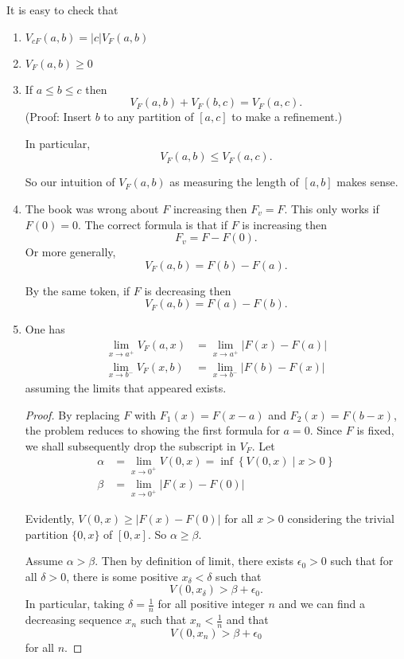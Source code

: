 \documentclass{article}
\newcommand{\Abs}[1]{\left| #1 \right|}
\begin{document}
It is easy to check that
\begin{enumerate}
\item $V_{c F}(a, b) = \Abs{c} V_F(a, b)$

\item $V_F(a, b) \geq 0$

\item If $a \leq b \leq c$ then
$$V_F(a, b) + V_F(b, c) = V_F(a, c).$$
(Proof: Insert $b$ to any partition of $[a, c]$ to make a refinement.)

In particular,
$$V_F(a, b) \leq V_F(a, c).$$

So our intuition of $V_F(a, b)$ as measuring the length of $[a, b]$ makes sense.

\item The book was wrong about $F$ increasing then $F_v = F$. This only works if $F(0) = 0$. The correct formula is that if $F$ is increasing then
$$F_v = F - F(0).$$
Or more generally,
$$V_F(a, b) = F(b) - F(a).$$

By the same token, if $F$ is decreasing then
$$V_F(a, b) = F(a) - F(b).$$

\item One has
\begin{align*}
\lim_{x \rightarrow a^+} V_F(a, x) &= \lim_{x \rightarrow a^+} \Abs{ F(x) - F(a) }\\
\lim_{x \rightarrow b^-} V_F(x, b) &= \lim_{x \rightarrow b^-} \Abs{ F(b) - F(x) }
\end{align*}
assuming the limits that appeared exists.

\begin{proof}
By replacing $F$ with $F_1(x) = F(x - a)$ and $F_2(x) = F(b - x)$, the problem reduces to showing the first formula for $a = 0$. Since $F$ is fixed, we shall subsequently drop the subscript in $V_F$. Let
\begin{align*}
\alpha &= \lim_{x \rightarrow 0^+} V(0, x) = \inf \left\{V(0, x) \;|\; x > 0 \right\}\\
\beta &= \lim_{x \rightarrow 0^+} \Abs{ F(x) - F(0) }
\end{align*}

Evidently, $V(0, x) \geq \Abs{ F(x) - F(0) }$ for all $x > 0$ considering the trivial partition $\{0, x\}$ of $[0, x]$. So $\alpha \geq \beta$.

Assume $\alpha > \beta$. Then by definition of limit, there exists $\epsilon_0 > 0$ such that for all $\delta > 0$, there is some positive $x_\delta < \delta$ such that $$V(0, x_\delta) > \beta + \epsilon_0.$$
In particular, taking $\delta = \frac{1}{n}$ for all positive integer $n$ and we can find a decreasing sequence $x_n$ such that $x_n < \frac 1n$ and that
$$V(0, x_n) > \beta + \epsilon_0$$
for all $n$.


\end{proof}
\end{enumerate}
\end{document}
